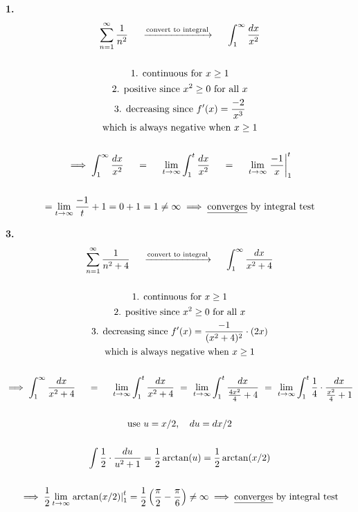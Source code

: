 \documentclass{article}
\begin{document}
\noindent
\textbf{
1.
}
\\
\begin{gather*}
\sum_{n=1}^{\infty} \frac{1}{n^2}
~~~~\xrightarrow{\text{convert to integral}}~~~~
\int_1^{\infty} \frac{dx}{x^2}
\\
\\
\text{1. continuous for } x \geq 1
\\
\text{2. positive since } x^2 \geq 0 \text{ for all } x
\\
\text{3. decreasing since }
f'(x)=\frac{-2}{x^3}
\\
\text{which is always negative when } x \geq 1
\\
\\
\implies
\int_1^{\infty} \frac{dx}{x^2}
~~~~=~~~~
\lim_{t \to \infty}
\int_1^t \frac{dx}{x^2}
~~~~=~~~~
\lim_{t \to \infty}
\left. \frac{-1}{x} \right|_1^t
\\
\\
=\lim_{t \to \infty}
\frac{-1}{t} + 1=0+1=1 \neq \infty
\implies \text{\underline{converges} by integral test}
\end{gather*}



\noindent
\textbf{
3.
}
\\
\begin{gather*}
\sum_{n=1}^{\infty} \frac{1}{n^2+4}
~~~~\xrightarrow{\text{convert to integral}}~~~~
\int_1^{\infty} \frac{dx}{x^2+4}
\\
\\
\text{1. continuous for } x \geq 1
\\
\text{2. positive since } x^2 \geq 0 \text{ for all } x
\\
\text{3. decreasing since }
f'(x)=\frac{-1}{(x^2+4)^2} \cdot (2x)
\\
\text{which is always negative when } x \geq 1
\\
\\
\implies
\int_1^{\infty} \frac{dx}{x^2+4}
~~~~=~~~~
\lim_{t \to \infty} \int_1^t \frac{dx}{x^2+4}
~=~
\lim_{t \to \infty} \int_1^t \frac{dx}{\frac{4x^2}{4}+4}
~=~
\lim_{t \to \infty} \int_1^t \frac{1}{4} \cdot \frac{dx}{\frac{x^2}{4}+1}
\\
\\
\text{use } u=x/2,
~~~
du=dx/2
\\
\\
\int \frac{1}{2} \cdot \frac{du}{u^2+1}
=\frac{1}{2} \arctan(u)
=\frac{1}{2} \arctan(x/2)
\\
\\
\implies
\frac{1}{2} \lim_{t \to \infty}
\left. \arctan(x/2) \right|_1^t
= \frac{1}{2} \left( \frac{\pi}{2} -\frac{\pi}{6} \right) \neq \infty
\implies \text{\underline{converges} by integral test}
\end{gather*}
\end{document}
